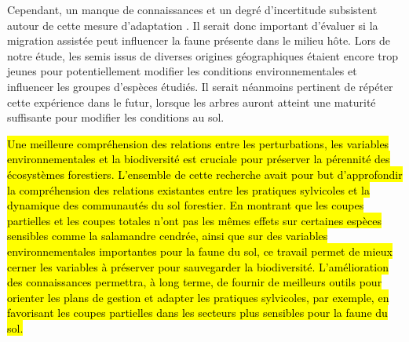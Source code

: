 Cependant, un manque de connaissances et un degré d’incertitude subsistent autour de cette mesure d’adaptation \citep{Klenk2015assistedmigration,Park2018Informationunderload}. 
Il serait donc important d’évaluer si la migration assistée peut influencer la faune présente dans le milieu hôte.
Lors de notre étude, les semis issus de diverses origines géographiques étaient encore trop jeunes pour potentiellement modifier les conditions environnementales et influencer les groupes d’espèces étudiés. 
Il serait néanmoins pertinent de répéter cette expérience dans le futur, lorsque les arbres auront atteint une maturité suffisante pour modifier les conditions au sol. 

\hl{Une meilleure compréhension des relations entre les perturbations, les variables environnementales et la biodiversité est cruciale pour préserver la pérennité des écosystèmes forestiers. 
L’ensemble de cette recherche avait pour but d'approfondir la compréhension des relations existantes entre les pratiques sylvicoles et la dynamique des communautés du sol forestier. 
En montrant que les coupes partielles et les coupes totales n'ont pas les mêmes effets sur certaines espèces sensibles comme la salamandre cendrée, ainsi que sur des variables environnementales importantes pour la faune du sol, 
ce travail permet de mieux cerner les variables à préserver pour sauvegarder la biodiversité. 
L'amélioration des connaissances permettra, à long terme, de fournir de meilleurs outils pour orienter les plans de gestion et adapter les pratiques sylvicoles, 
par exemple, en favorisant les coupes partielles dans les secteurs plus sensibles pour la faune du sol. }


\cleardoublepage



